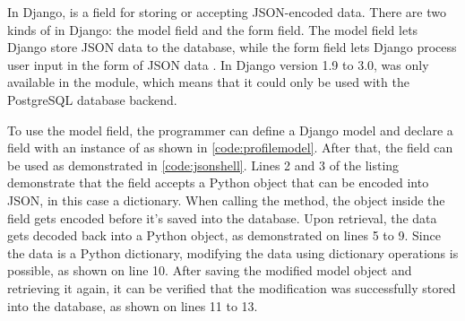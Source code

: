 In Django,  is a field for storing or accepting JSON-encoded
data. There are two kinds of  in Django: the model field and
the form field. The model field lets Django store JSON data to the database,
while the form field lets Django process user input in the form of JSON data
\cite{django30_modeljsonfield, django30_formjsonfield}. In Django version
1.9 to 3.0,  was only available in the
 module, which means that it could only be used
with the PostgreSQL database backend.



\noindent
\begin{minipage}{\linewidth}

\end{minipage}

To use the  model field, the programmer can define a Django
model and declare a field with an instance of  as shown in
\autoref{code:profilemodel}. After that, the field can be used as demonstrated
in \autoref{code:jsonshell}. Lines 2 and 3 of the listing demonstrate that the
field accepts a Python object that can be encoded into JSON, in this case a
dictionary. When calling the  method, the object inside the
field gets encoded before it's saved into the database. Upon retrieval, the
data gets decoded back into a Python object, as demonstrated on lines 5 to 9.
Since the data is a Python dictionary, modifying the data using dictionary
operations is possible, as shown on line 10. After saving the modified model
object and retrieving it again, it can be verified that the modification was
successfully stored into the database, as shown on lines 11 to 13.

\noindent
\begin{minipage}{\linewidth}

\end{minipage}

